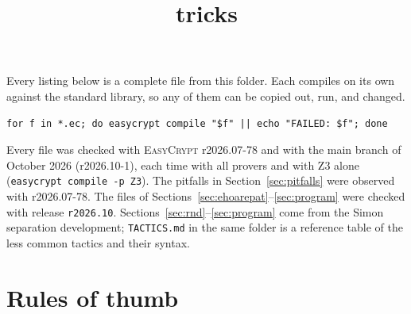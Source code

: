 \documentclass[10pt,a4paper]{article}
\title{\EC{} tricks}
\author{}
\date{}
\newcommand{\ec}{\lstinline[basicstyle=\small\ttfamily]}
\newcommand{\EC}{\textsc{EasyCrypt}}
\begin{document}
\maketitle

\noindent
Every listing below is a complete file from this folder.
Each compiles on its own against the standard library, so any of them can be copied out, run, and changed.

\begin{lstlisting}[language={},numbers=none]
for f in *.ec; do easycrypt compile "$f" || echo "FAILED: $f"; done
\end{lstlisting}

\noindent
Every file was checked with \EC{} r2026.07-78 and with the main branch of October 2026 (r2026.10-1), each time with all provers and with Z3 alone (\ec|easycrypt compile -p Z3|).
The pitfalls in Section~\ref{sec:pitfalls} were observed with r2026.07-78.
The files of Sections~\ref{sec:ehoarepat}--\ref{sec:program} were checked with release \texttt{r2026.10}.
Sections~\ref{sec:rnd}--\ref{sec:program} come from the Simon separation development; \texttt{TACTICS.md} in the same folder is a reference table of the less common tactics and their syntax.

\tableofcontents

\section{Rules of thumb}
\end{document}
